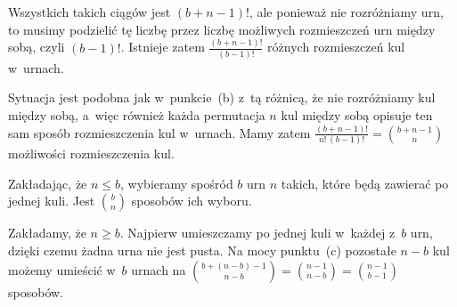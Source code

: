 Wszystkich takich ciągów jest $(b+n-1)!$, ale ponieważ nie rozróżniamy urn, to musimy podzielić tę liczbę przez liczbę możliwych rozmieszczeń urn między sobą, czyli $(b-1)!$. Istnieje zatem $\frac{(b+n-1)!}{(b-1)!}$ różnych rozmieszczeń kul w~urnach.

\subproblem %
Sytuacja jest podobna jak w~punkcie~(b) z~tą różnicą, że nie rozróżniamy kul między sobą, a~więc również każda permutacja $n$ kul między sobą opisuje ten sam sposób rozmieszczenia kul w~urnach. Mamy zatem $\frac{(b+n-1)!}{n!\,(b-1)!}=\binom{b+n-1}{n}$ możliwości rozmieszczenia kul.

\subproblem %
Zakładając, że $n\le b$, wybieramy spośród $b$ urn $n$ takich, które będą zawierać po jednej kuli. Jest $\binom{b}{n}$ sposobów ich wyboru.

\subproblem %
Zakładamy, że $n\ge b$. Najpierw umieszczamy po jednej kuli w~każdej z~$b$ urn, dzięki czemu żadna urna nie jest pusta. Na mocy punktu~(c) pozostałe $n-b$ kul możemy umieścić w~$b$ urnach na $\binom{b+(n-b)-1}{n-b}=\binom{n-1}{n-b}=\binom{n-1}{b-1}$ sposobów.

\endinput
